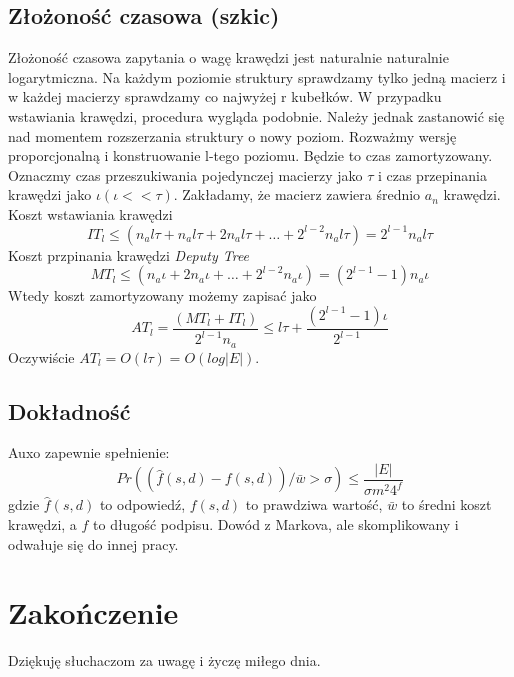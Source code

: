 \documentclass{article}
\theoremstyle{definition}
\begin{document}
    \subsection{Złożoność czasowa (szkic)}
        Złożoność czasowa zapytania o wagę krawędzi jest naturalnie naturalnie logarytmiczna. Na każdym poziomie struktury sprawdzamy tylko jedną macierz i w każdej macierzy sprawdzamy co najwyżej r kubełków. W przypadku wstawiania krawędzi, procedura wygląda podobnie. Należy jednak zastanowić się nad momentem rozszerzania struktury o nowy poziom. Rozważmy wersję proporcjonalną i konstruowanie l-tego poziomu. Będzie to czas zamortyzowany. Oznaczmy czas przeszukiwania pojedynczej macierzy jako $\tau$ i czas przepinania krawędzi jako $\iota (\iota << \tau)$. Zakładamy, że macierz zawiera średnio $a_n$ krawędzi. Koszt wstawiania krawędzi 
        \[
            IT_l \leq (n_al\tau + n_al\tau + 2n_al\tau + \dots + 2^{l-2}n_al\tau) = 2^{l-1}n_al\tau
        \]
        Koszt przpinania krawędzi \textit{Deputy Tree} 
        \[
            MT_l \leq (n_a\iota + 2n_a\iota + \dots + 2^{l-2}n_a\iota) = (2^{l-1} - 1)n_a\iota
        \]
        Wtedy koszt zamortyzowany możemy zapisać jako
        \[
            AT_l = \frac{(MT_l + IT_l)}{2^{l-1}n_a} \leq l\tau + \frac{(2^{l-1} - 1)\iota}{2^{l-1}}
        \]
        Oczywiście $AT_l = O(l\tau) = O(log|E|)$.
        
    
    \subsection{Dokładność}
        Auxo zapewnie spełnienie:
        \[
            Pr((\hat{f}(s,d) - f(s,d)) / \bar{w} > \sigma) \leq \frac{|E|}{\sigma m^2 4^f}
        \]
        gdzie $\hat{f}(s,d)$ to odpowiedź, $f(s,d)$ to prawdziwa wartość, $\bar{w}$ to średni koszt krawędzi, a $f$ to długość podpisu. Dowód z Markova, ale skomplikowany i odwałuje się do innej pracy.
    
    \section{Zakończenie}
    Dziękuję słuchaczom za uwagę i życzę miłego dnia. 
    
\end{document}
